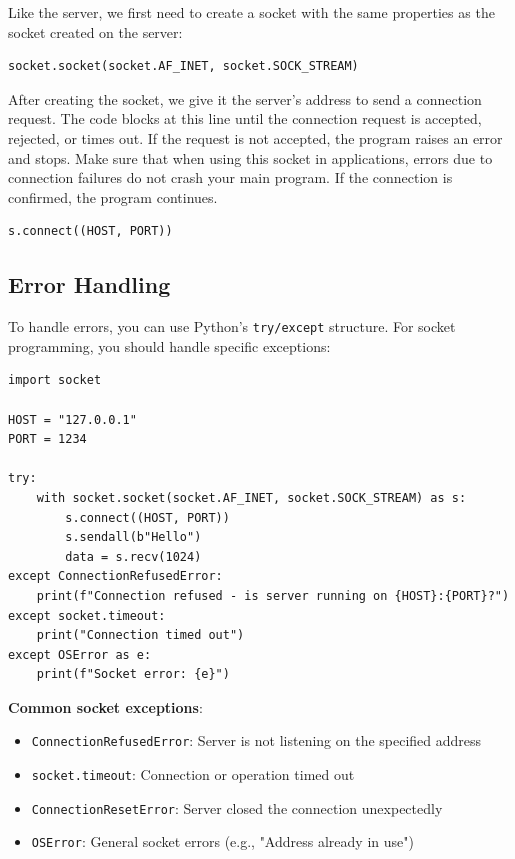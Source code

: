\documentclass[]{article}
\begin{document}
  Like the server, we first need to create a socket with the same properties as the socket created on the server:

  \begin{verbatim}
socket.socket(socket.AF_INET, socket.SOCK_STREAM)
  \end{verbatim}

  After creating the socket, we give it the server's address to send a connection request.
  The code blocks at this line until the connection request is accepted, rejected, or times out.
  If the request is not accepted, the program raises an error and stops.
  Make sure that when using this socket in applications, errors due to connection failures do not crash your main program.
  If the connection is confirmed, the program continues.

  \begin{verbatim}
s.connect((HOST, PORT))
  \end{verbatim}

  \subsection{Error Handling}

  To handle errors, you can use Python's \texttt{try/except} structure. For socket programming, you should handle specific exceptions:

  \begin{verbatim}
import socket

HOST = "127.0.0.1"
PORT = 1234

try:
    with socket.socket(socket.AF_INET, socket.SOCK_STREAM) as s:
        s.connect((HOST, PORT))
        s.sendall(b"Hello")
        data = s.recv(1024)
except ConnectionRefusedError:
    print(f"Connection refused - is server running on {HOST}:{PORT}?")
except socket.timeout:
    print("Connection timed out")
except OSError as e:
    print(f"Socket error: {e}")
  \end{verbatim}

  \textbf{Common socket exceptions}:
  \begin{itemize}
    \item \texttt{ConnectionRefusedError}: Server is not listening on the specified address
    \item \texttt{socket.timeout}: Connection or operation timed out
    \item \texttt{ConnectionResetError}: Server closed the connection unexpectedly
    \item \texttt{OSError}: General socket errors (e.g., "Address already in use")
  \end{itemize}
\end{document}
